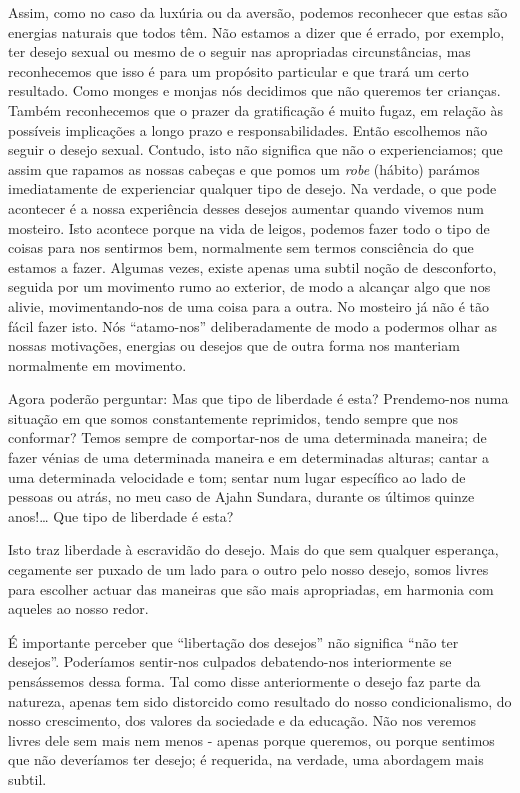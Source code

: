 Assim, como no caso da luxúria ou da aversão, podemos reconhecer que
estas são energias naturais que todos têm. Não estamos a dizer que é
errado, por exemplo, ter desejo sexual ou mesmo de o seguir nas
apropriadas circunstâncias, mas reconhecemos que isso é para um
propósito particular e que trará um certo resultado. Como monges e
monjas nós decidimos que não queremos ter crianças. Também reconhecemos
que o prazer da gratificação é muito fugaz, em relação às possíveis
implicações a longo prazo e responsabilidades. Então escolhemos não
seguir o desejo sexual. Contudo, isto não significa que não o
experienciamos; que assim que rapamos as nossas cabeças e que pomos um
\emph{robe} (hábito) parámos imediatamente de experienciar qualquer tipo
de desejo. Na verdade, o que pode acontecer é a nossa experiência desses
desejos aumentar quando vivemos num mosteiro. Isto acontece porque na
vida de leigos, podemos fazer todo o tipo de coisas para nos sentirmos
bem, normalmente sem termos consciência do que estamos a fazer. Algumas
vezes, existe apenas uma subtil noção de desconforto, seguida por um
movimento rumo ao exterior, de modo a alcançar algo que nos alivie,
movimentando-nos de uma coisa para a outra. No mosteiro já não é tão
fácil fazer isto. Nós ``atamo-nos'' deliberadamente de modo a podermos
olhar as nossas motivações, energias ou desejos que de outra forma nos
manteriam normalmente em movimento.

Agora poderão perguntar: Mas que tipo de liberdade é esta? Prendemo-nos
numa situação em que somos constantemente reprimidos, tendo sempre que
nos conformar? Temos sempre de comportar-nos de uma determinada maneira;
de fazer vénias de uma determinada maneira e em determinadas alturas;
cantar a uma determinada velocidade e tom; sentar num lugar específico
ao lado de pessoas ou atrás, no meu caso de Ajahn Sundara, durante os
últimos quinze anos!\ldots{} Que tipo de liberdade é esta?

Isto traz liberdade à escravidão do desejo. Mais do que sem qualquer
esperança, cegamente ser puxado de um lado para o outro pelo nosso
desejo, somos livres para escolher actuar das maneiras que são mais
apropriadas, em harmonia com aqueles ao nosso redor.

É importante perceber que ``libertação dos desejos'' não significa ``não
ter desejos''. Poderíamos sentir-nos culpados debatendo-nos
interiormente se pensássemos dessa forma. Tal como disse anteriormente o
desejo faz parte da natureza, apenas tem sido distorcido como resultado
do nosso condicionalismo, do nosso crescimento, dos valores da sociedade
e da educação. Não nos veremos livres dele sem mais nem menos - apenas
porque queremos, ou porque sentimos que não deveríamos ter desejo; é
requerida, na verdade, uma abordagem mais subtil.


